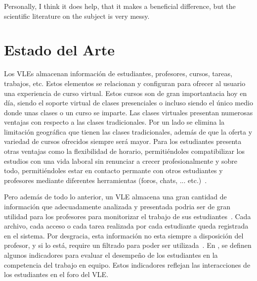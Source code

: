 

\begin{savequote}[50mm]
Personally, I think it does help, that it makes a beneficial difference, but the scientific literature on the subject is very messy.
%
\end{savequote}


\chapter{Estado del Arte}
\label{cha:State of the Art}

\ifpdf
    \graphicspath{{2_state_of_the_art/figures/PNG/}{2_state_of_the_art/figures/PDF/}{2_state_of_the_art/figures/}}
\else
    \graphicspath{{2_state_of_the_art/figures/EPS/}{2_state_of_the_art/figures/}}
\fi



Los VLEs almacenan información de estudiantes, profesores, cursos, tareas, trabajos, etc. Estos elementos se relacionan y configuran para ofrecer al usuario una experiencia de curso virtual. Estos cursos son de gran importantacia hoy en día, siendo el soporte virtual de clases presenciales o incluso siendo el único medio donde unas clases o un curso se imparte. Las clases virtuales presentan numerosas ventajas con respecto a las clases tradicionales. Por un lado se elimina la limitación geográfica que tienen las clases tradicionales, además de que la oferta y variedad de cursos ofrecidos siempre será mayor. Para los estudiantes presenta otras ventajas como la flexibilidad de horario, permitiéndoles compatibilizar los estudios con una vida laboral sin renunciar a crecer profesionalmente y sobre todo, permitiéndoles estar en contacto permante con otros estudiantes y profesores mediante diferentes herramientas (foros, chats, ... etc.)~\cite{alAjlan:2008}.


Pero además de todo lo anterior, un VLE almacena una gran cantidad de información que adecuadamente analizada y presentada podria ser de gran utilidad para los profesores para monitorizar el trabajo de sus estudiantes~\cite{podgorelec:2011}. Cada archivo, cada acceso o cada tarea realizada por cada estudiante queda registrada en el sistema. Por desgracia, esta información no esta siempre a disposición del profesor, y si lo está, require un filtrado para poder ser utilizada~\cite{Chebil:2012}. En \cite{fidalgo:2015}, se definen algunos indicadores para evaluar el desempeño de los estudiantes en la competencia del trabajo en equipo. Estos indicadores reflejan las interacciones de los estudiantes en el foro del VLE.

